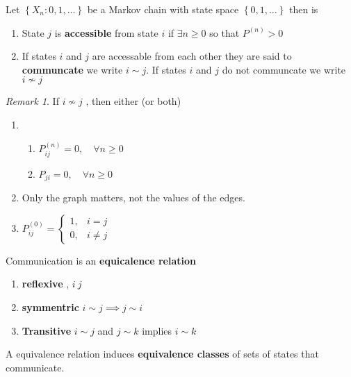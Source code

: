 \documentclass{article}
\theoremstyle{remark}
\newtheorem*{remark}{Remark}
\begin{document}
\begin{definition}
  Let $\left\{ X_{n}: 0, 1 , \ldots \right\}$ be a Markov chain with state space $\left\{ 0, 1 , \ldots \right\}$ then is 
  \begin{enumerate}[label=(\roman*)]
    \item State $j$ is \textbf{ accessible}  from state $i $ if $\exists n \ge 0$  so that $P^{(n)} > 0$ 
    \item If states $i$ and $j$ are accessable from each other they are said to \textbf{communcate }  we write $ i \sim j$. If states $i$ and $j$ do not communcate we write $i \not \sim  j$
  \end{enumerate}
\end{definition}

\begin{remark}
  If $ i \not \sim  j$ , then either (or both) 
  \begin{enumerate}[label=(\alph*)]
    \item
    \begin{enumerate}[label=(\roman*)]
    \item $P^{(n)}_{ij} = 0, \quad  \forall n\ge0 $
    \item  $P_{ji} = 0, \quad  \forall n\ge0 $
    \end{enumerate}
  \item Only the graph matters, not the values of the edges.
  \item $P^{(0)}_{ij} = \begin{cases}
    1,  &  i = j \\
    0,  &  i\neq j
  \end{cases}$

  \end{enumerate}
\end{remark}

\begin{theorem}
  Communication is an \textbf{equicalence relation} 
  \begin{enumerate}[label=(\roman*)]
    \item \textbf{reflexive} , $i ~ j$
    \item  \textbf{symmentric }  $i \sim  j \implies  j \sim i$
    \item \textbf{Transitive}  $i \sim j$ and $ j \sim k$ implies $i \sim k$
  \end{enumerate}
  A equivalence relation induces \textbf{equivalence classes} of sets of states that communicate.
\end{theorem}
\end{document}
